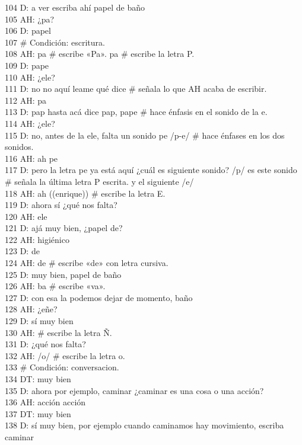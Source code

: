 104 D: a ver escriba ahí papel de baño\\
105 AH: ¿pa?\\
106 D: papel\\
107 \# Condición: escritura.\\
108 AH: pa \# escribe «Pa». pa \# escribe la letra P.\\
109 D: pape\\
110 AH: ¿ele?\\
111 D: no no aquí leame qué dice \# señala lo que AH acaba de escribir.\\
112 AH: pa\\
113 D: pap hasta acá dice pap, pape \# hace énfasis en el sonido de la e.\\
114 AH: ¿ele?\\
115 D: no, antes de la ele, falta un sonido pe /p-e/ \# hace énfases en los dos sonidos.\\
116 AH: ah pe\\
117 D: pero la letra pe ya está aquí ¿cuál es siguiente sonido? /p/ es este sonido \# señala la última letra P escrita. y el siguiente /e/\\
118 AH: ah ((enrique)) \# escribe la letra E.\\
119 D: ahora sí ¿qué nos falta?\\
120 AH: ele\\
121 D: ajá muy bien, ¿papel de?\\
122 AH: higiénico\\
123 D: de\\
124 AH: de \# escribe «de» con letra cursiva.\\
125 D: muy bien, papel de baño\\
126 AH: ba \# escribe «va».\\
127 D: con esa la podemos dejar de momento, baño\\
128 AH: ¿eñe?\\
129 D: sí muy bien\\
130 AH: \# escribe la letra Ñ.\\
131 D: ¿qué nos falta?\\
132 AH: /o/ \# escribe la letra o.\\
133 \# Condición: conversacion.\\
134 DT: muy bien\\
135 D: ahora por ejemplo, caminar ¿caminar es una cosa o una acción?\\
136 AH: acción acción\\
137 DT: muy bien\\
138 D: sí muy bien, por ejemplo cuando caminamos hay movimiento, escriba caminar\\
